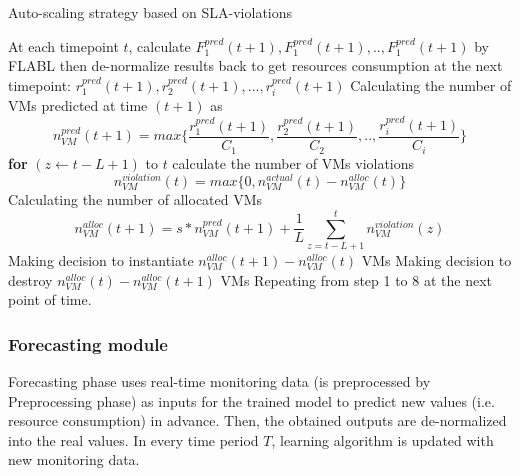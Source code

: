 \documentclass[runningheads]{llncs}
\begin{document}
\begin{algorithm}[thb]
	\caption{Auto-scaling strategy based on SLA-violations}\label{algo_auto_scaling}
	\begin{algorithmic}[1]
		\State At each timepoint $t$, calculate 
			$F^{pred}_{1}(t+1), F^{pred}_{1}(t+1), .., F^{pred}_{1}(t+1)$ by FLABL 
			\Statex then de-normalize results back to get resources consumption at the next timepoint:
			$r^{pred}_{1}(t+1), r^{pred}_{2}(t+1), ..., r^{pred}_{i}(t+1)$
		\State Calculating the number of VMs predicted at time $(t+1)$ as 
			\begin{equation} \label{eq_vm_predictions}
				n^{pred}_{VM} (t+1)  = 
				max \Big\{ \frac{ r^{pred}_{1}(t+1) }{ C_1 }, \frac{ r^{pred}_{2}(t+1) }{ C_2 },.., \frac{ r^{pred}_{i}(t+1) }{ C_i } \Big\}
			\end{equation}	
		\State \textbf{for} $(z \gets t-L+1)$ to $t$ calculate the number of VMs violations  
			\begin{equation}\label{eq_vm_violations}
				n^{violation}_{VM} (t) = max \big\{  0, n^{actual}_{VM} (t) - n^{alloc}_{VM} (t)  \Big\}
			\end{equation}
		\State Calculating the number of allocated VMs 
			\begin{equation}\label{eq_vm_allocated}
				n^{alloc}_{VM} (t+1) = s * n^{pred}_{VM} (t+1) + \frac{1}{L} \displaystyle\sum_{z=t-L+1}^t n^{violation}_{VM} (z)
			\end{equation}
			\State Making decision to instantiate $ n^{alloc}_{VM} (t+1) - n^{alloc}_{VM} (t) $ VMs
		\Else
			\State Making decision to destroy $ n^{alloc}_{VM} (t) - n^{alloc}_{VM} (t+1) $ VMs
		\EndIf
		\State Repeating from step 1 to 8 at the next point of time.
	\end{algorithmic}
\end{algorithm}


\subsubsection{Forecasting module}
\label{forecasting_module}
Forecasting phase uses real-time monitoring data (is preprocessed by Preprocessing phase) as inputs for the trained model to predict new values (i.e. resource consumption) in advance. Then, the obtained outputs are de-normalized into the real values. In every time period $T$, learning algorithm is updated with new monitoring data.
\end{document}
